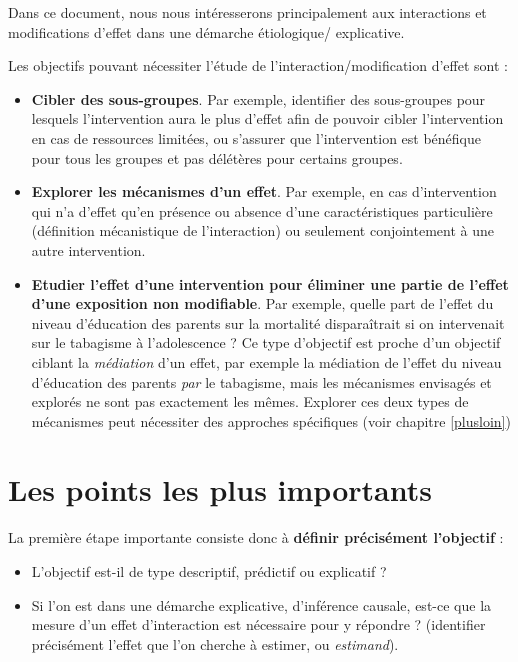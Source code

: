 \documentclass[
]{book}
\providecommand{\tightlist}{%
  \setlength{\itemsep}{0pt}\setlength{\parskip}{0pt}}
\begin{document}
Dans ce document, nous nous intéresserons principalement aux interactions et modifications d'effet dans une démarche étiologique/ explicative.

Les objectifs pouvant nécessiter l'étude de l'interaction/modification d'effet sont \citet{vanderweele_tutorial_2014} :

\begin{itemize}
\tightlist
\item
  \textbf{Cibler des sous-groupes}. Par exemple, identifier des sous-groupes pour lesquels l'intervention aura le plus d'effet afin de pouvoir cibler l'intervention en cas de ressources limitées, ou s'assurer que l'intervention est bénéfique pour tous les groupes et pas délétères pour certains groupes.
\item
  \textbf{Explorer les mécanismes d'un effet}. Par exemple, en cas d'intervention qui n'a d'effet qu'en présence ou absence d'une caractéristiques particulière (définition mécanistique de l'interaction) ou seulement conjointement à une autre intervention.
\item
  \textbf{Etudier l'effet d'une intervention pour éliminer une partie de l'effet d'une exposition non modifiable}. Par exemple, quelle part de l'effet du niveau d'éducation des parents sur la mortalité disparaîtrait si on intervenait sur le tabagisme à l'adolescence ? Ce type d'objectif est proche d'un objectif ciblant la \emph{médiation} d'un effet, par exemple la médiation de l'effet du niveau d'éducation des parents \emph{par} le tabagisme, mais les mécanismes envisagés et explorés ne sont pas exactement les mêmes. Explorer ces deux types de mécanismes peut nécessiter des approches spécifiques (voir chapitre \ref{plusloin})
\end{itemize}

\hypertarget{les-points-les-plus-importants}{%
\section{Les points les plus importants}\label{les-points-les-plus-importants}}

La première étape importante consiste donc à \textbf{définir précisément l'objectif} :

\begin{itemize}
\tightlist
\item
  L'objectif est-il de type descriptif, prédictif ou explicatif ?
\item
  Si l'on est dans une démarche explicative, d'inférence causale, est-ce que la mesure d'un effet d'interaction est nécessaire pour y répondre ? (identifier précisément l'effet que l'on cherche à estimer, ou \emph{estimand}).
\end{itemize}
\end{document}
